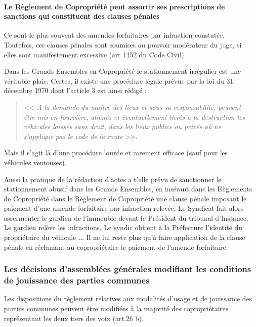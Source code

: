 			\paragraph{Le Règlement de Copropriété peut assortir ses prescriptions de sanctions qui constituent des clauses pénales}
			
				Ce sont le plus souvent des amendes forfaitaires par infraction constatée. Toutefois, ces clauses pénales sont soumises au pouvoir modérateur du juge, si elles sont manifestement excessive (art 1152 du Code Civil)
				
				Dans les Grands Ensembles en Copropriété le stationnement irrégulier est une véritable plaie. Certes, il existe une procédure légale prévue par la loi du 31 décembre 1970 dont l'article 3 est ainsi rédigé :
				\begin{quote}
					<< {\itshape A la demande du maître des lieux et sous sa responsabilité, peuvent être mis en fourrière, aliénés et éventuellement livrés à la destruction les véhicules laissés sans droit, dans les lieux publics ou privés où ne s'applique pas le code de la route} >>.
				\end{quote}
				
				Mais il s'agit là d'une procédure lourde et rarement efficace (sauf pour les véhicules ventouses).
				
				Aussi la pratique de la rédaction d'actes a t'elle prévu de sanctionner le stationnement abusif dans les Grands Ensembles, en insérant dans les Règlements de Copropriété dans le Règlement de Copropriété une clause pénale imposant le paiement d'une amende forfaitaire par infraction relevée. Le Syndicat fait alors assermenter le gardien de l'immeuble devant le Président du tribunal d'Instance. Le gardien relève les infractions. Le syndic obtient à la Préfecture l'identité du propriétaire du véhicule ... Il ne lui reste plus qu'à faire application de la clause pénale en réclamant au copropriétaire le paiement de l'amende forfaitaire.	
		
		\subsubsection{Les décisions d'assemblées générales modifiant les conditions de jouissance des parties communes}
		
			Les dispositions du règlement relatives aux modalités d'usage et de jouissance des parties communes peuvent être modifiées à la majorité des copropriétaires représentant les deux tiers des voix (art.26 b).
			
